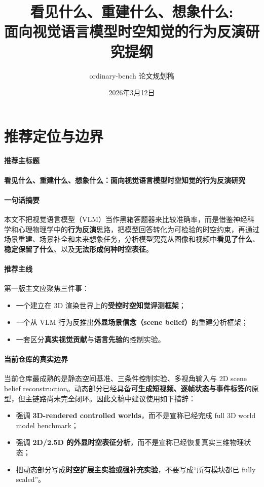 \documentclass[UTF8,12pt,fontset=none]{ctexart}
\title{看见什么、重建什么、想象什么:\\
面向视觉语言模型时空知觉的行为反演研究提纲}
\author{ordinary-bench 论文规划稿}
\date{2026年3月12日}
\begin{document}
\maketitle
\tableofcontents

\section{推荐定位与边界}

\paragraph{推荐主标题}
\textbf{看见什么、重建什么、想象什么：面向视觉语言模型时空知觉的行为反演研究}

\paragraph{一句话摘要}
本文不把视觉语言模型（VLM）当作黑箱答题器来比较准确率，而是借鉴神经科学和心理物理学中的\textbf{行为反演}思路，把模型回答转化为可检验的时空约束，再通过场景重建、场景补全和未来想象任务，分析模型究竟从图像和视频中\textbf{看见了什么}、\textbf{稳定保留了什么}、以及\textbf{无法形成何种时空表征}。

\paragraph{推荐主线}
第一版主文应聚焦三件事：
\begin{itemize}
  \item 一个建立在 3D 渲染世界上的\textbf{受控时空知觉评测框架}；
  \item 一个从 VLM 行为反推出\textbf{外显场景信念（scene belief）}的重建分析框架；
  \item 一套区分\textbf{真实视觉贡献}与\textbf{语言先验}的控制实验。
\end{itemize}

\paragraph{当前仓库的真实边界}
当前仓库最成熟的是静态空间基准、三条件控制实验、多视角输入与 2D scene belief reconstruction。动态部分已经具备\textbf{可生成短视频、逐帧状态与事件标签}的原型，但主链路尚未完全闭环。因此文稿中建议使用如下措辞：
\begin{itemize}
  \item 强调 \textbf{3D-rendered controlled worlds}，而不是宣称已经完成 full 3D world model benchmark；
  \item 强调 \textbf{2D/2.5D 的外显时空表征分析}，而不是宣称已经恢复真实三维物理状态；
  \item 把动态部分写成\textbf{时空扩展主实验或强补充实验}，不要写成“所有模块都已 fully scaled”。
\end{itemize}
\end{document}
